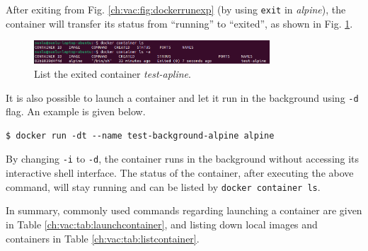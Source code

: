 After exiting from Fig. \ref{ch:vac:fig:dockerrunexp} (by using \verb|exit| in \textit{alpine}), the container will transfer its status from ``running'' to ``exited'', as shown in Fig. \ref{ch:vac:fig:dockerrunexppart3}.
\begin{figure}
	\centering
	\includegraphics[width=250pt]{chapters/ch-virtualization-and-containerization/figures/dockerrunexppart3.png}
	\caption{List the exited container \textit{test-apline}.} \label{ch:vac:fig:dockerrunexppart3}
\end{figure}

It is also possible to launch a container and let it run in the background using \verb|-d| flag. An example is given below.
\begin{lstlisting}
$ docker run -dt --name test-background-alpine alpine
\end{lstlisting}
By changing \verb|-i| to \verb|-d|, the container runs in the background without accessing its interactive shell interface. The status of the container, after executing the above command, will stay running and can be listed by \verb|docker container ls|.

In summary, commonly used commands regarding launching a container are given in Table \ref{ch:vac:tab:launchcontainer}, and listing down local images and containers in Table \ref{ch:vac:tab:listcontainer}.

